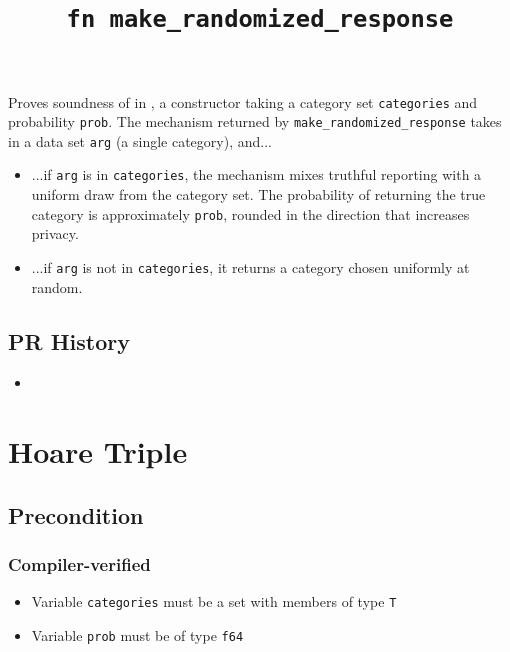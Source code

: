 \documentclass{article}
\title{\texttt{fn make\_randomized\_response}}
\author{\MichaelShoemateAuthor}
\begin{document}
\maketitle

\contrib

Proves soundness of  in ,
a constructor taking a category set \texttt{categories} and probability \texttt{prob}.
The mechanism returned by \texttt{make\_randomized\_response} takes in a data set \texttt{arg} (a single category), and...

\begin{itemize}
    \item ...if \texttt{arg} is in \texttt{categories},
    the mechanism mixes truthful reporting with a uniform draw from the category set.
    The probability of returning the true category is approximately \texttt{prob}, rounded in the direction that increases privacy.
    \item ...if \texttt{arg} is not in \texttt{categories},
    it returns a category chosen uniformly at random.
\end{itemize}

\subsection*{PR History}
\begin{itemize}
    \item {}
\end{itemize}

\section{Hoare Triple}

\subsection*{Precondition}
\subsubsection*{Compiler-verified}
\begin{itemize}
    \item Variable \texttt{categories} must be a set with members of type \texttt{T}
    \item Variable \texttt{prob} must be of type \texttt{f64}
\end{itemize}
\end{document}
